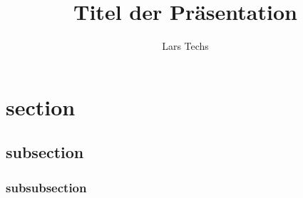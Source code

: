 \documentclass{beamer}
\author{Lars Techs}
\institute{Freie Universität Berlin}
\title{Titel der Präsentation}
\begin{document}
\section{section }
\subsection{subsection}
\subsubsection{subsubsection}
  
\lspbeamertitle

% 
  
\end{document}
